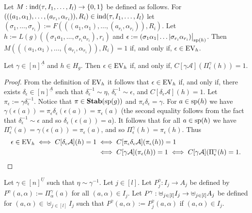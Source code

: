 \documentclass[../main/thesis.tex]{subfiles}
\begin{document}
Let $M : \text{\upshape ind} (\tau, I_1, \ldots , I_l) \rightarrow \{0,1\}$ be defined as follows. For
$(((a_1, \alpha_1), \ldots, (a_{r_i}, \alpha_{r_i})), R_i) \in \text{\upshape ind} (\tau, I_1,
\ldots , I_l)$ let $(\sigma_1, \ldots, \sigma_{r_i}) := F(((a_1, \alpha_1),
\ldots, (a_{r_i}, \alpha_{r_i})), R_i)$. Let $h := L(g)((\sigma_1 a_1, \ldots,
\sigma_{r_i} a_{r_i}), r_i)$ and $\epsilon := \restr{(\sigma_1 \alpha_1 \vert
  \ldots \vert \sigma_{r_i} \alpha_{r_i})}{\consp(h)}$. Then $M(((a_1,
\alpha_1), \ldots, (a_{r_i}, \alpha_{r_i})), R_i) = 1$ if, and only if,
$\epsilon \in \text{EV}_h$.

\begin{lem}
	Let $\gamma\in [n]^{\underline{A}}$ and $h \in H_g$. Then $\epsilon \in \text{EV}_h$
  if, and only if, $C[\gamma \mathcal{A}](\Pi^{\gamma}_{\epsilon} (h)) = 1$.
  \label{lem:translate-EV-circuits}
\end{lem}
\begin{proof}
  From the definition of $\text{EV}_h$ it follows that $\epsilon \in \text{EV}_h$ if, and
  only if, there exists $\delta_{\epsilon} \in [n]^{\underline{A}}$ such that
  $\delta^{-1}_{\epsilon} \sim \eta$, $\delta^{-1}_{\epsilon} \sim \epsilon$,
  and $C[\delta_{\epsilon} \mathcal{A}](h) = 1$. Let $\pi_{\epsilon} := \gamma
  \delta^{-1}_{\epsilon}$. Notice that $\pi \in \text{\textbf{Stab}} (\text{sp} (g))$ and $\pi_{\epsilon}
  \delta_{\epsilon} = \gamma$. For $a \in \text{sp}(h)$ we have $\gamma
  (\epsilon(a)) = \pi_{\epsilon} \delta_{\epsilon} (\epsilon (a)) =
  \pi_{\epsilon}(a)$ (the second equality follows from the fact that
  $\delta^{-1}_{\epsilon} \sim \epsilon$ and so $\delta_{\epsilon} (\epsilon
  (a)) = a$). It follows that for all $a \in \text{sp}(h)$ we have
  $\Pi^{\gamma}_\epsilon (a) = \gamma (\epsilon (a)) = \pi_{\epsilon}(a)$, and
  so $\Pi^{\gamma}_{\epsilon}(h) = \pi_{\epsilon}(h)$. Thus
  \begin{align*}
    \epsilon \in \text{EV}_h \iff C[\delta_{\epsilon} \mathcal{A}](h) = 1 
    & \iff C[\pi_\epsilon \delta_{\epsilon} \mathcal{A}](\pi_{\epsilon} (h)) = 1 \\
    & \iff C[\gamma \mathcal{A}](\pi_{\epsilon} (h)) = 1 
      \iff C[\gamma \mathcal{A}](\Pi^{\gamma}_{\epsilon}(h) = 1.
  \end{align*}
  
\end{proof}

Let $\gamma \in [n]^{\underline{U}}$ such that $\eta \sim \gamma^{-1}$. Let $j
\in [l]$. Let $P^{\gamma}_j: I_j \rightarrow A_j$ be defined by $P^{\gamma} (a,
\alpha) := \Pi^{\gamma}_{\alpha}(a)$ for all $(a, \alpha) \in I_j$. Let
$P^{\gamma} : \uplus_{j \in [l]} I_j \rightarrow \uplus_{j \in [l]}A_j$ be defined for
$(a, \alpha) \in \uplus_{j \in [l]} I_j$ such that $P^{\gamma}(a, \alpha) :=
P^{\gamma}_j (a, \alpha)$ if $(a, \alpha) \in I_j$.
\end{document}
